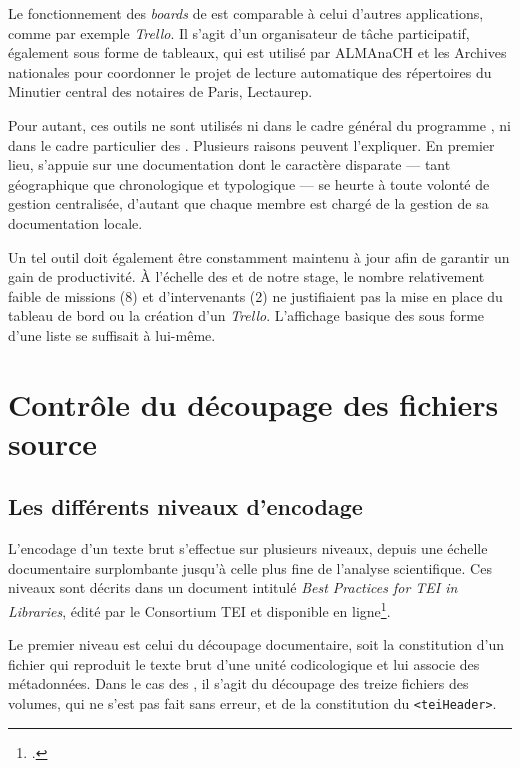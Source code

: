 Le fonctionnement des \textit{boards} de \gitlab{} est comparable à celui d'autres applications, comme par exemple \textit{Trello}. Il s'agit d'un organisateur de tâche participatif, également sous forme de tableaux, qui est utilisé par ALMAnaCH et les Archives nationales pour coordonner le projet de lecture automatique des répertoires du Minutier central des notaires de Paris, Lectaurep.

Pour autant, ces outils ne sont utilisés ni dans le cadre général du programme \timeus, ni dans le cadre particulier des \odm. Plusieurs raisons peuvent l'expliquer. En premier lieu, \timeus{} s'appuie sur une documentation dont le caractère disparate --- tant géographique que chronologique et typologique --- se heurte à toute volonté de gestion centralisée, d'autant que chaque membre est chargé de la gestion de sa documentation locale.

Un tel outil doit également être constamment maintenu à jour afin de garantir un gain de productivité. À l'échelle des \odm{} et de notre stage, le nombre relativement faible de missions (8) et d'intervenants (2) ne justifiaient pas la mise en place du tableau de bord \gitlab{} ou la création d'un \textit{Trello}. L'affichage basique des \issues{} sous forme d'une liste se suffisait à lui-même.

\newpage
\thispagestyle{empty}
\mbox{}
\newpage

\chapter{Contrôle du découpage des fichiers source}

\section{Les différents niveaux d'encodage}

L'encodage d'un texte brut s'effectue sur plusieurs niveaux, depuis une échelle documentaire surplombante jusqu'à celle plus fine de l'analyse scientifique. Ces niveaux sont décrits dans un document intitulé \textit{Best Practices for TEI in Libraries}, édité par le Consortium TEI et disponible en ligne\footcite[\textit{4.2. Encoding Levels}]{bestpratice}.

Le premier niveau est celui du découpage documentaire, soit la constitution d'un fichier qui reproduit le texte brut d'une unité codicologique et lui associe des métadonnées. Dans le cas des \odm, il s'agit du découpage des treize fichiers des volumes, qui ne s'est pas fait sans erreur, et de la constitution du \texttt{<teiHeader>}.

